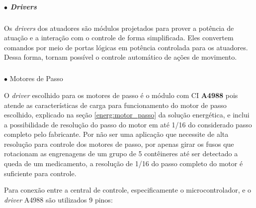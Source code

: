     \subparagraph*{$\bullet$ Drivers} \hfill
    
    Os \textit{drivers} dos atuadores são módulos projetados para prover a potência de atuação e a interação com o controle de forma simplificada. Eles convertem comandos por meio de portas lógicas em potência controlada para os atuadores. Dessa forma, tornam possível o controle automático de ações de movimento.
    
    \subparagraph*{} $\bullet$ Motores de Passo
    
    O \textit{driver} escolhido para os motores de passo é o módulo com CI \textbf{A4988} pois atende as características de carga para funcionamento do motor de passo escolhido, explicado na seção \ref{energ:motor_passo} da solução energética, e inclui a possibilidade de resolução do passo do motor em até 1/16 do considerado passo completo pelo fabricante. Por não ser uma aplicação que necessite de alta resolução para controle dos motores de passo, por apenas girar os fusos que rotacionam as engrenagens de um grupo de 5 contêineres até ser detectado a queda de um medicamento, a resolução de 1/16 do passo completo do motor é suficiente para controle. 
    
    Para conexão entre a central de controle, especificamente o microcontrolador, e o \textit{driver} A4988 são utilizados 9 pinos:
    
